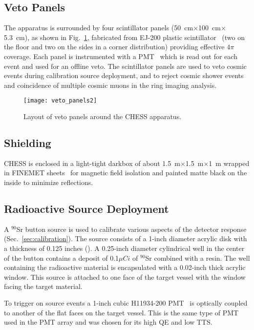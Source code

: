 \subsection{Veto Panels}\label{s:veto}

The apparatus is surrounded by four scintillator panels (50~cm$\times$100~cm$\times$5.3~cm), as shown in Fig.~\ref{f:veto}, fabricated from EJ-200 plastic scintillator~\cite{ej200} (two on the floor and two on the sides in a corner distribution) providing effective $4\pi$ coverage. 
Each panel is instrumented with a PMT~\cite{9102ksb} which is read out for each event and used for an offline veto. The scintillator panels are used to veto cosmic events during calibration source deployment, and to reject cosmic shower events and coincidence of multiple cosmic muons in the ring imaging analysis. 

\begin{figure}
\centering
\texttt{[image: veto\_panels2]}
\caption{Layout of veto panels around the CHESS apparatus. }
\label{f:veto}
\end{figure}


\subsection{Shielding}
CHESS is enclosed in a light-tight darkbox of about 1.5~m$\times$1.5~m$\times$1~m wrapped in FINEMET\textsuperscript{\textregistered} sheets~\cite{finemet} for magnetic field isolation and painted matte black on the inside to minimize reflections.  


\subsection{Radioactive Source Deployment}\label{s:source}
A $^{90}$Sr button source is used to calibrate various aspects of the detector response (Sec.~\ref{sec:calibration}).  The source consists of a 1-inch diameter acrylic disk with a thickness of 0.125 inches (\cite{buttonsource}). A 0.25-inch diameter cylindrical well in the center of the button contains a deposit of 0.1$\mu Ci$ of $^{90}$Sr combined with a resin. The well containing the radioactive material is encapsulated with a 0.02-inch thick acrylic window. This source is attached to one face of the target vessel with the window facing the target material.

To trigger on source events a  1-inch cubic H11934-200  PMT~\cite{h11934} is optically coupled to another of the flat faces on the target vessel. This is the same type of PMT used in the PMT array and was chosen for its high QE and low TTS. 

